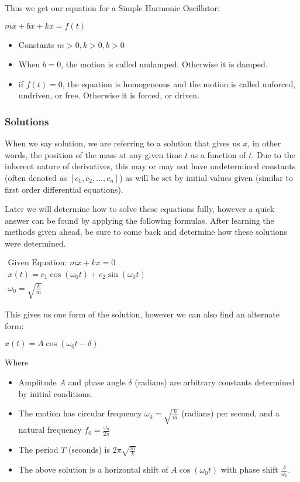 \documentclass[12pt,landscape,twocolumn]{article}
\begin{document}
        Thus we get our equation for a Simple Harmonic Oscillator:

            $ m \ddot{x} + b \dot{x} + kx = f(t) $

            \begin{itemize}
                \item Constants $m>0, k>0, b>0$
                \item When $b=0$, the motion is called undamped. Otherwise it is damped.
                \item if $f(t)=0$, the equation is homogeneous and the motion is called unforced, undriven, or free. Otherwise it is forced, or driven.
            \end{itemize}

        \subsubsection{Solutions}
        When we say solution, we are referring to a solution that gives us $x$, in other words, the position of the mass at any given time $t$ as a function of $t$. Due to the inherent nature of derivatives, this may or may not have undetermined constants (often denoted as $[c_1, c_2, \dots, c_n]$) as will be set by initial values given (similar to first order differential equations).

        Later we will determine how to solve these equations fully, however a quick answer can be found by applying the following formulas. After learning the methods given ahead, be sure to come back and determine how these solutions were determined.

            $ \begin{aligned}
                \text{Given Equation: } m \ddot{x} + kx = 0\\
                x(t) = c_1 \cos \left( \omega_0 t \right) + c_2 \sin \left( \omega_0 t \right)\\
                \omega_0 = \sqrt{\frac{k}{m} }
            \end{aligned} $

        This gives us one form of the solution, however we can also find an alternate form:

            $ x(t) = A \cos \left( \omega_0 t - \delta \right) $

        Where
            \begin{itemize}
                \item Amplitude $A$ and phase angle $\delta$ (radians) are arbitrary constants determined by initial conditions.
                \item The motion has circular frequency $\omega_0 = \sqrt{\frac{k}{m} }$ (radians) per second, and a natural frequency $f_0 = \frac{\omega_0}{2 \pi}$
                \item The period $T$ (seconds) is $2 \pi \sqrt{\frac{m}{k} }$
                \item The above solution is a horizontal shift of $A \cos (\omega_0 t)$ with phase shift $\frac{\delta}{\omega_0}$.
            \end{itemize}
\end{document}
